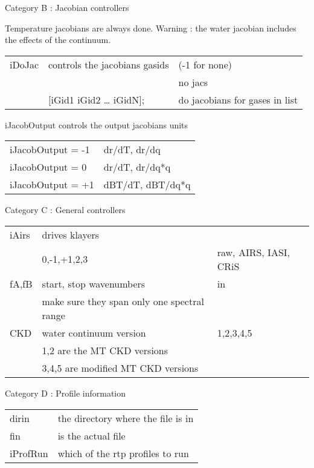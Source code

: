 \documentclass[11pt]{article}
\begin{document}
Category B : Jacobian controllers

Temperature jacobians are always done. Warning : the water jacobian
includes the effects of the continuum.\\

\begin{center}
\begin{tabular}{lll}
iDoJac & controls the jacobians gasids & (-1 for none)\\
 &  & no jacs\\
 & [iGid1 iGid2 \ldots{} iGidN]; & do jacobians for gases in list\\
\end{tabular}
\end{center}

iJacobOutput controls the output jacobians units\\

\begin{center}
\begin{tabular}{ll}
iJacobOutput = -1 & dr/dT, dr/dq\\
iJacobOutput = 0 & dr/dT, dr/dq*q\\
iJacobOutput = +1 & dBT/dT, dBT/dq*q\\
\end{tabular}
\end{center}

Category C : General controllers

\begin{center}
\begin{tabular}{lll}
iAirs & drives klayers & \\
 & 0,-1,+1,2,3 & raw, AIRS, IASI, CRiS\\
fA,fB & start, stop wavenumbers & in\\
 & make sure they span only one spectral range & \\
CKD & water continuum version & 1,2,3,4,5\\
 & 1,2 are the MT CKD versions & \\
 & 3,4,5 are modified MT CKD versions & \\
\end{tabular}
\end{center}

Category D : Profile information

\begin{center}
\begin{tabular}{ll}
dirin & the directory where the file is in\\
fin & is the actual file\\
iProfRun & which of the rtp profiles to run\\
\end{tabular}
\end{center}
\end{document}

